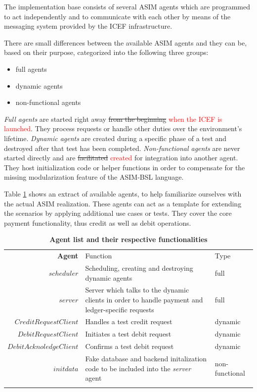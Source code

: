 The implementation base consists of several ASIM agents which are programmed to act independently and to communicate with each other by means of the messaging system provided by the ICEF infrastructure.

There are small differences between the available ASIM agents and they can be, based on their purpose, categorized into the following three groups:
\begin{itemize}
	\item full agents
	\item dynamic agents
	\item non-functional agents
\end{itemize}
\textit{Full agents} are started right away \st{from the beginning} \textcolor{red}{when the ICEF is launched}. They process requests or handle other duties over the environment's lifetime. \textit{Dynamic agents} are created during a specific phase of a test and destroyed after that test has been completed. \textit{Non-functional agents} are never started directly and are \st{facilitated} \textcolor{red}{created} for integration into another agent. They host initialization code or helper functions in order to compensate for the missing modularization feature of the ASIM-BSL language.

Table \ref{tab:model-agents} shows an extract of available agents, to help familiarize ourselves with the actual ASIM realization. These agents can act as a template for extending the scenarios by applying additional use cases or tests. They cover the core payment functionality, thus credit as well as debit operations.

\begin{table}[H]
\begin{centering}
\small
{
\begin{tabular}{ r | p{9cm} | l }
\hline
\textbf{Agent}	& Function & Type \\
\Xhline{1.5pt}
$scheduler$				& Scheduling, creating and destroying dynamic agents & full\\[3pt]
\hline
$server$				& Server which talks to the dynamic clients in order to handle payment and ledger-specific requests & full\\[3pt]
\hline
$CreditRequestClient$	& Handles a test credit request & dynamic\\[3pt]
\hline
$DebitRequestClient$	& Initiates a test debit request & dynamic\\[3pt]
\hline
$DebitAcknoledgeClient$	& Confirms a test debit request & dynamic\\[3pt]
\hline
$initdata$				& Fake database and backend initalization code to be included into the \textit{server} agent & non-functional\\[3pt]
\Xhline{1.5pt}
\end{tabular}
}
\caption{\small\textbf{Agent list and their respective functionalities}}
\label{tab:model-agents}
\end{centering}
\vspace{-0.5cm}
\end{table}

